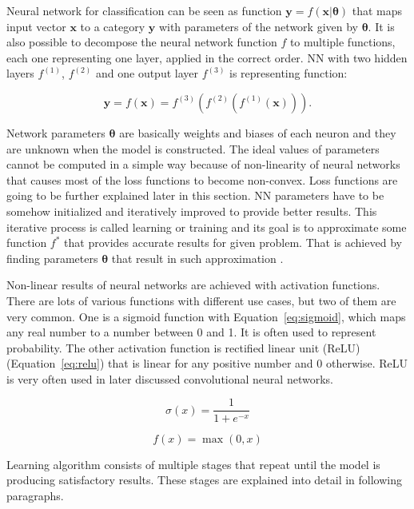 Neural network for classification can be seen as function $\pmb y=f(\pmb x | \pmb \theta)$ that maps input vector $\pmb x$ to a category $\pmb y$ with parameters of the network given by $\pmb \theta$. It is also possible to decompose the neural network function $f$ to multiple functions, each one representing one layer, applied in the correct order. NN with two hidden layers $f^{(1)}$, $f^{(2)}$ and one output layer $f^{(3)}$ is representing function:

\begin{equation}
    \label{eq:forward-prop}
    \pmb y = f(\pmb x) = f^{(3)}(f^{(2)}(f^{(1)}(\pmb x))).
\end{equation}

Network parameters $\pmb \theta$ are basically weights and biases of each neuron and they are unknown when the model is constructed. The ideal values of parameters cannot be computed in a simple way because of non-linearity of neural networks that causes most of the loss functions to become non-convex. Loss functions are going to be further explained later in this section. NN parameters have to be somehow initialized and iteratively improved to provide better results. This iterative process is called learning or training and its goal is to approximate some function $f^*$ that provides accurate results for given problem. That is achieved by finding parameters $\pmb \theta$ that result in such approximation \cite{Goodfellow-et-al-2016}.

Non-linear results of neural networks are achieved with activation functions. There are lots of various functions with different use cases, but two of them are very common. One is a sigmoid function with Equation~\ref{eq:sigmoid}, which maps any real number to a number between 0 and 1. It is often used to represent probability. The other activation function is rectified linear unit (ReLU) (Equation~\ref{eq:relu}) that is linear for any positive number and 0 otherwise. ReLU is very often used in later discussed convolutional neural networks.

\begin{equation}
    \label{eq:sigmoid}
    \sigma (x) = \frac{1}{1 + e^{-x}}
\end{equation}

\begin{equation}
    \label{eq:relu}
    f(x) = \max(0, x)
\end{equation}

Learning algorithm consists of multiple stages that repeat until the model is producing satisfactory results. These stages are explained into detail in following paragraphs.


